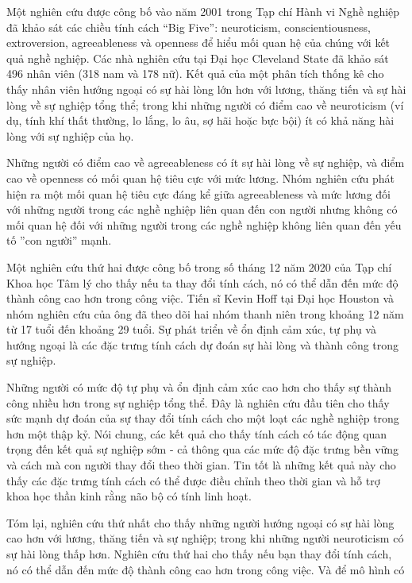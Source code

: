 \documentclass[]{article}
\begin{document}
Một nghiên cứu được công bố vào năm 2001 trong Tạp chí Hành vi Nghề nghiệp đã khảo sát các chiều tính cách “Big Five”: neuroticism, conscientiousness, extroversion, agreeableness và openness để hiểu mối quan hệ của chúng với kết quả nghề nghiệp. Các nhà nghiên cứu tại Đại học Cleveland State đã khảo sát 496 nhân viên (318 nam và 178 nữ). Kết quả của một phân tích thống kê cho thấy nhân viên hướng ngoại có sự hài lòng lớn hơn với lương, thăng tiến và sự hài lòng về sự nghiệp tổng thể; trong khi những người có điểm cao về neuroticism (ví dụ, tính khí thất thường, lo lắng, lo âu, sợ hãi hoặc bực bội) ít có khả năng hài lòng với sự nghiệp của họ. 

Những người có điểm cao về agreeableness có ít sự hài lòng về sự nghiệp, và điểm cao về openness có mối quan hệ tiêu cực với mức lương. Nhóm nghiên cứu phát hiện ra một mối quan hệ tiêu cực đáng kể giữa agreeableness và mức lương đối với những người trong các nghề nghiệp liên quan đến con người nhưng không có mối quan hệ đối với những người trong các nghề nghiệp không liên quan đến yếu tố ''con người'' mạnh.

Một nghiên cứu thứ hai được công bố trong số tháng 12 năm 2020 của Tạp chí Khoa học Tâm lý cho thấy nếu ta thay đổi tính cách, nó có thể dẫn đến mức độ thành công cao hơn trong công việc. Tiến sĩ Kevin Hoff tại Đại học Houston và nhóm nghiên cứu của ông đã theo dõi hai nhóm thanh niên trong khoảng 12 năm từ 17 tuổi đến khoảng 29 tuổi. Sự phát triển về ổn định cảm xúc, tự phụ và hướng ngoại là các đặc trưng tính cách dự đoán sự hài lòng và thành công trong sự nghiệp.

Những người có mức độ tự phụ và ổn định cảm xúc cao hơn cho thấy sự thành công nhiều hơn trong sự nghiệp tổng thể. Đây là nghiên cứu đầu tiên cho thấy sức mạnh dự đoán của sự thay đổi tính cách cho một loạt các nghề nghiệp trong hơn một thập kỷ. Nói chung, các kết quả cho thấy tính cách có tác động quan trọng đến kết quả sự nghiệp sớm - cả thông qua các mức độ đặc trưng bền vững và cách mà con người thay đổi theo thời gian. Tin tốt là những kết quả này cho thấy các đặc trưng tính cách có thể được điều chỉnh theo thời gian và hỗ trợ khoa học thần kinh rằng não bộ có tính linh hoạt. \cite{forbesScientistsDiscoverSalary}

Tóm lại, nghiên cứu thứ nhất cho thấy những người hướng ngoại có sự hài lòng cao hơn với lương, thăng tiến và sự nghiệp; trong khi những người neuroticism có sự hài lòng thấp hơn. Nghiên cứu thứ hai cho thấy nếu bạn thay đổi tính cách, nó có thể dẫn đến mức độ thành công cao hơn trong công việc. Và để mô hình có 
\end{document}
